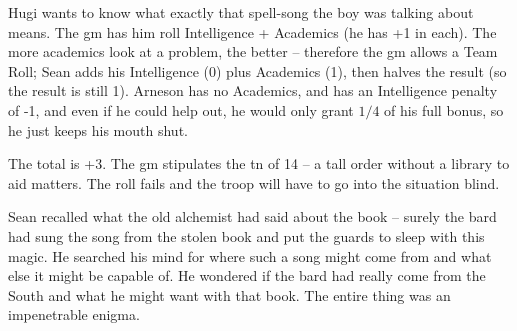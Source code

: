 \begin{exampletext}

  Hugi wants to know what exactly that spell-song the boy was talking about means.
  The \gls{gm} has him roll Intelligence + Academics (he has +1 in each).
  The more academics look at a problem, the better -- therefore the \gls{gm} allows a Team Roll; Sean adds his Intelligence (0) plus Academics (1), then halves the result (so the result is still 1).
  Arneson has no Academics, and has an Intelligence penalty of -1, and even if he could help out, he would only grant $1/4$ of his full bonus, so he just keeps his mouth shut.

  The total is +3.
  The \gls{gm} stipulates the \gls{tn} of 14 -- a tall order without a library to aid matters.
  The roll fails and the troop will have to go into the situation blind.

  Sean recalled what the old alchemist had said about the book -- surely the bard had sung the song from the stolen book and put the guards to sleep with this magic.
  He searched his mind for where such a song might come from and what else it might be capable of.
  He wondered if the bard had really come from the South and what he might want with that book.
  The entire thing was an impenetrable enigma.

\end{exampletext}
